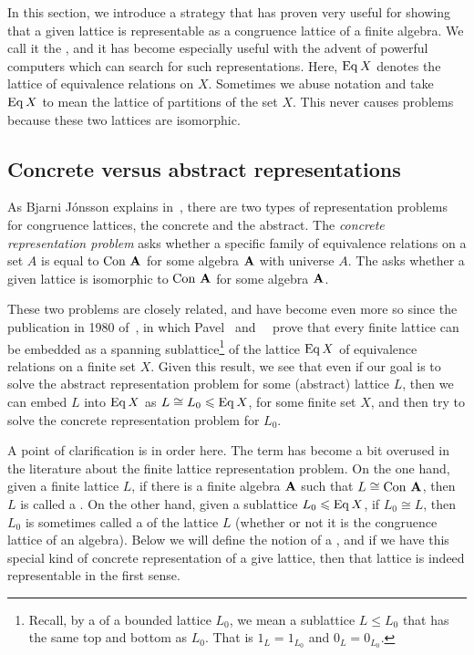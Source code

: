 
In this section, we introduce a strategy that has proven very useful for showing
that a given lattice is representable as a congruence lattice of a finite
algebra. We call it the , and it has become especially
useful with the advent of powerful computers which can search for such
representations.  Here,  $\operatorname{Eq} X$ denotes the lattice of equivalence
relations on $X$. Sometimes we abuse notation and take $\operatorname{Eq} X$ to mean the
lattice of partitions of the set $X$. This never causes problems because these
two lattices are isomorphic.  

\subsection{Concrete versus abstract representations}
As Bjarni J\'onsson explains in~\cite{Jonsson:1972}, there are two types of
representation problems for congruence lattices, the concrete and the
abstract.  The \emph{concrete representation problem} asks whether a specific family of
equivalence relations on a set $A$ is equal to $\operatorname{Con\,} \mathbf{A}$ for some
algebra $\mathbf{A}$ with universe $A$.  The 
asks whether a given lattice is isomorphic to $\operatorname{Con\,} \mathbf{A}$ for some algebra $\mathbf{A}$.

These two problems are closely related, and have become even more so since the
publication in 1980 
of~\cite{Pudlak:1980}, in which Pavel \Pudlak\ and
\Jiri\ \Tuma\ prove that every finite
lattice can be embedded as a 
spanning sublattice\footnote{Recall, by a 
  of a bounded lattice $L_0$, we mean a sublattice $L\leq L_0$ that has the same top and
  bottom as $L_0$.  That is  $1_L = 1_{L_0}$ and $0_L = 0_{L_0}$.}
of the lattice $\operatorname{Eq} X$ of equivalence relations on a finite set $X$.   
Given this result, we see that even if our goal is to solve the abstract
representation problem for some (abstract) lattice $L$, then
we can embed $L$ into $\operatorname{Eq} X$ as $L\cong L_0\leqslant \operatorname{Eq} X$, for some finite set
$X$, and then try to solve the concrete representation problem for $L_0$.  

A point of clarification is in order here.  The term 
has become a bit overused in the literature about the finite lattice
representation problem.  On the one hand, given a finite lattice $L$, if there
is a finite algebra $\mathbf{A}$ such that $L \cong \operatorname{Con\,} \mathbf{A}$, then $L$ is called a
.  On the other hand, given a sublattice $L_0\leqslant \operatorname{Eq} X$, 
if $L_0\cong L$, then $L_0$ is sometimes called a 
of the lattice $L$ (whether or not it is the congruence lattice of an algebra).    
Below we will define the notion of a , and if we
have this special kind of concrete representation of a give lattice, then that
lattice is indeed representable in the first sense.

